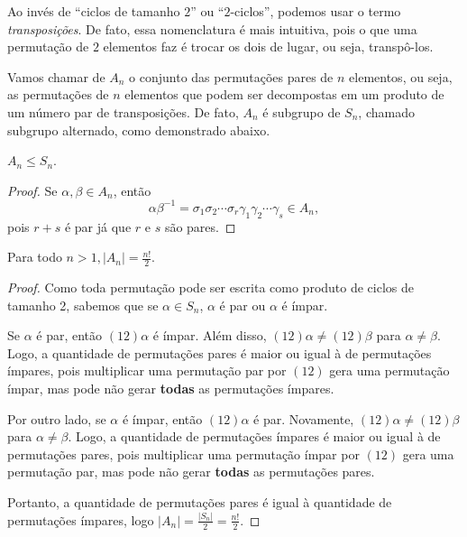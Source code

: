 	\par\vspace{0.3cm} Ao invés de ``ciclos de tamanho $2$'' ou
	``$2$-ciclos'', podemos usar o termo \textit{transposições}. 
	De fato, essa nomenclatura é mais intuitiva, pois o que uma
	permutação de $2$ elementos faz é trocar os dois de lugar, 
	ou seja, transpô-los.
	\par\vspace{0.3cm} Vamos chamar de $A_n$ o conjunto das
	permutações pares de $n$ elementos, ou seja, as permutações 
	de $n$ elementos que podem ser decompostas em um produto 
	de um número par de transposições. De fato, $A_n$ é 
	subgrupo de $S_n$, chamado subgrupo alternado, como demonstrado abaixo.
	\begin{theorem}
	\label{grupo alternante subgrupo de S_n}
		$A_n \leq S_n$.
	\end{theorem}
	\begin{proof}
        Se $\alpha, \beta \in A_n$, então
        \begin{equation*}
        \alpha\beta^{-1}
        = 
        \sigma_1\sigma_2\cdots\sigma_r\gamma_1\gamma_2\cdots\gamma_s \in A_n,
        \end{equation*}
        pois $r+s$ é par já que $r$ e $s$ são pares. 
    \end{proof}
	\begin{theorem}
	\label{ordem do grupo alternante}
		Para todo $n>1, |A_n| = \displaystyle{\frac{n!}{2}}$.
	\end{theorem}
	\begin{proof}
		Como toda permutação pode ser escrita como produto de 
		ciclos de tamanho 2, sabemos que se 
		$\alpha\in S_n$, $\alpha$ é par ou $\alpha$ é ímpar.
		\par\vspace{0.3cm} Se $\alpha$ é par, então $(12)\alpha$ é ímpar.
		Além disso, $(12)\alpha\neq (12)\beta$ para $\alpha\neq\beta$.
		Logo, a quantidade de permutações pares é maior ou igual à de
		permutações ímpares, pois multiplicar uma permutação par por
		$(12)$ gera uma permutação ímpar, mas pode não gerar
		\textbf{todas} as permutações ímpares.
		\par\vspace{0.3cm} Por outro lado, se $\alpha$ é ímpar, então
		$(12)\alpha$ é par. Novamente, $(12)\alpha\neq (12)\beta$ para
		$\alpha\neq\beta$. Logo, a quantidade de permutações ímpares é
		maior ou igual à de permutações pares, pois multiplicar uma
		permutação ímpar por $(12)$ gera uma permutação par, mas pode 
		não gerar \textbf{todas} as permutações pares.
		\par\vspace{0.3cm} Portanto, a quantidade de permutações pares é
		igual à quantidade de permutações ímpares, logo 
		$|A_n| = \displaystyle{\frac{|S_n|}{2} = \frac{n!}{2} }$.
	\end{proof} 
